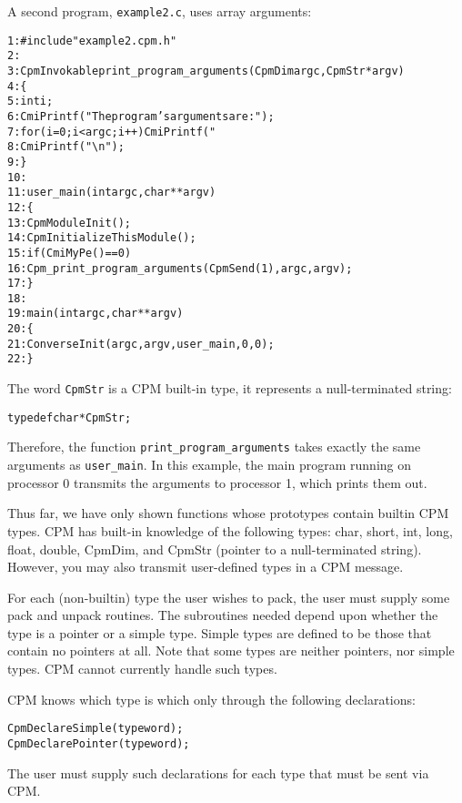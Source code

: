 A second program, {\tt example2.c}, uses array arguments:

\begin{alltt}
 1:    #include "example2.cpm.h"
 2:   
 3:    CpmInvokable print_program_arguments(CpmDim argc, CpmStr *argv)
 4:    \{
 5:      int i;
 6:      CmiPrintf("The program's arguments are: ");
 7:      for (i=0; i<argc; i++) CmiPrintf("%s ", argv[i]);
 8:      CmiPrintf("\verb+\+n");
 9:    \}
10:
11:    user_main(int argc, char **argv)
12:    \{
13:      CpmModuleInit();
14:      CpmInitializeThisModule();
15:      if (CmiMyPe()==0)
16:        Cpm_print_program_arguments(CpmSend(1), argc, argv);
17:    \}
18:
19:    main(int argc, char **argv)
20:    \{
21:      ConverseInit(argc, argv, user_main, 0, 0);
22:    \}
\end{alltt}

The word {\tt CpmStr} is a CPM built-in type, it represents a
null-terminated string:

\begin{alltt}
	typedef char *CpmStr;
\end{alltt}

Therefore, the function {\tt print\_program\_arguments} takes exactly
the same arguments as {\tt user\_main}.  In this example, the main
program running on processor 0 transmits the arguments to processor 1,
which prints them out.

Thus far, we have only shown functions whose prototypes contain
builtin CPM types.  CPM has built-in knowledge of the following types:
char, short, int, long, float, double, CpmDim, and CpmStr (pointer to
a null-terminated string).  However, you may also transmit
user-defined types in a CPM message.

For each (non-builtin) type the user wishes to pack, the user must
supply some pack and unpack routines.  The subroutines needed depend
upon whether the type is a pointer or a simple type.  Simple types are
defined to be those that contain no pointers at all.  Note that some
types are neither pointers, nor simple types.  CPM cannot currently
handle such types.

CPM knows which type is which only through the following declarations:

\begin{alltt}
    CpmDeclareSimple(typeword);
    CpmDeclarePointer(typeword);
\end{alltt}

The user must supply such declarations for each type that must be sent
via CPM.

